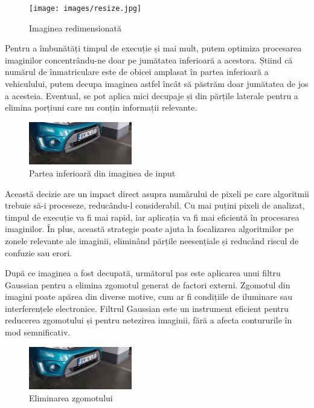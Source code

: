 \documentclass[a4paper,12pt]{report}
\begin{document}
\begin{figure}[h]
    \centering
    \texttt{[image: images/resize.jpg]}
    \caption{Imaginea redimensionată}
\end{figure}
\FloatBarrier

Pentru a îmbunătăți timpul de execuție și mai mult, putem optimiza procesarea imaginilor concentrându-ne doar pe jumătatea inferioară a acestora. Știind că numărul de înmatriculare este de obicei amplasat în partea inferioară a vehiculului, putem decupa imaginea astfel încât să păstrăm doar jumătatea de jos a acesteia. Eventual, se pot aplica mici decupaje și din părțile laterale pentru a elimina porțiuni care nu conțin informații relevante.

\begin{figure}[h]
    \centering
    \includegraphics[width=0.4\textwidth]{images/crop.jpg}
    \caption{Partea inferioară din imaginea de input}
\end{figure}
\FloatBarrier

Această decizie are un impact direct asupra numărului de pixeli pe care algoritmii trebuie să-i proceseze, reducându-l considerabil. Cu mai puțini pixeli de analizat, timpul de execuție va fi mai rapid, iar aplicația va fi mai eficientă în procesarea imaginilor. În plus, această strategie poate ajuta la focalizarea algoritmilor pe zonele relevante ale imaginii, eliminând părțile neesențiale și reducând riscul de confuzie sau erori.

După ce imaginea a fost decupată, următorul pas este aplicarea unui filtru Gaussian pentru a elimina zgomotul generat de factori externi. Zgomotul din imagini poate apărea din diverse motive, cum ar fi condițiile de iluminare sau interferențele electronice. Filtrul Gaussian este un instrument eficient pentru reducerea zgomotului și pentru netezirea imaginii, fără a afecta contururile în mod semnificativ.

\begin{figure}[h]
    \centering
    \includegraphics[width=0.4\textwidth]{images/gauss.jpg}
    \caption{Eliminarea zgomotului}
\end{figure}
\FloatBarrier
\end{document}

